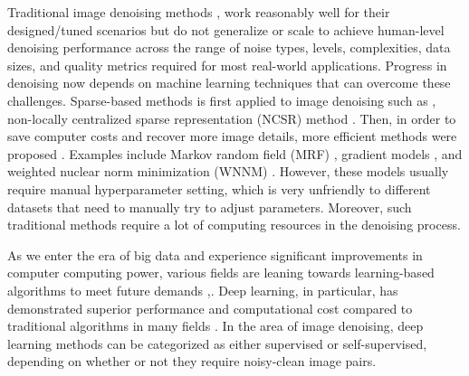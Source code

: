 \documentclass[conference]{IEEEtran}
\begin{document}
Traditional image denoising methods \cite{dabov2007image}, \cite{buades2011non, buades2005non, starck2002curvelet, dabov2006image, mihcak1999low, chen1999tri, zhang2008multiresolution} work reasonably well for their designed/tuned scenarios but do not generalize or scale to achieve human-level denoising performance across the range of noise types, levels, complexities, data sizes, and quality metrics required for most real-world applications. Progress in denoising now depends on machine learning techniques that can overcome these challenges. Sparse-based methods is first applied to image denoising such as \cite{dabov2007image}, non-locally centralized sparse representation (NCSR) method \cite{dong2012nonlocally}. Then, in order to save computer costs and recover more image details, more efficient methods were proposed \cite{elad2006image, schmidt2014shrinkage, osher2005iterative, ren2019simultaneous, zuo2014gradient, gu2014weighted}. Examples include Markov random field (MRF) \cite{schmidt2014shrinkage}, gradient models \cite{zuo2014gradient}, and weighted nuclear norm minimization (WNNM) \cite{gu2014weighted}. However, these models usually require manual hyperparameter setting, which is very unfriendly to different datasets that need to manually try to adjust parameters. Moreover, such traditional methods require a lot of computing resources in the denoising process.

As we enter the era of big data and experience significant improvements in computer computing power, various fields are leaning towards learning-based algorithms to meet future demands \cite{wei2023research,chen2022relax,wang2022adversarial,pokle2022contrasting, wang2022cnn,yang2022deep,mei2023mac,chen2020item,gong2016research,he2023hiercat,wang2023b,hong2020end,lu2023deep},\cite{gu2023unveiling}. Deep learning, in particular, has demonstrated superior performance and computational cost compared to traditional algorithms in many fields \cite{dabov2007image, wen2021openmem, wang2022simd, dabov2007image, minaee2021deep, tabernik2019deep, luo2015adaptive, gu2014weighted, goossens2009removal, makinen2019exact, jiang2023magnetic, sachdev2019machine, yang2022deep, bist2023mislaying, li2022atrous, ma2020statistical, ma2022traffic, he2021interpretable, lin2022cascade, wang2022cnn, alzubaidi2023survey}.
In the area of image denoising, deep learning methods can be categorized as either supervised or self-supervised, depending on whether or not they require noisy-clean image pairs.
\end{document}
